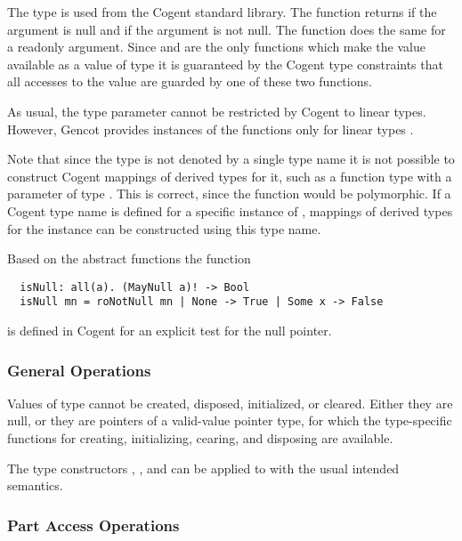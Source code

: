 The type  is used from the Cogent standard library. 
The function  returns  if the argument is null and  if the argument  is not null.
The function  does the same for a readonly argument. 
Since  and  are the only functions which make the value available as a value of type  
it is guaranteed by the Cogent type constraints that all accesses to the value are guarded by one of these two functions. 

As usual,
the type parameter  cannot be restricted by Cogent to linear types. However, Gencot provides instances of the functions only for
linear types .

Note that since the type  is not denoted by a single type name it is not possible to construct Cogent mappings of derived types for it, such
as a function type with a parameter of type . This is correct, since the function would be polymorphic. If a Cogent type name 
is defined for a specific instance of , mappings of derived types for the instance can be constructed using this type name.

Based on the abstract functions the function
\begin{verbatim}
  isNull: all(a). (MayNull a)! -> Bool
  isNull mn = roNotNull mn | None -> True | Some x -> False
\end{verbatim}
is defined in Cogent for an explicit test for the null pointer.

\subsubsection{General Operations}

Values of type  cannot be created, disposed, initialized, or cleared. Either they are null, or they are pointers of
a valid-value pointer type, for which the type-specific functions for creating, initializing, cearing, and disposing are available.

The type constructors , , and  can be applied to  with the usual intended
semantics.

\subsubsection{Part Access Operations}

